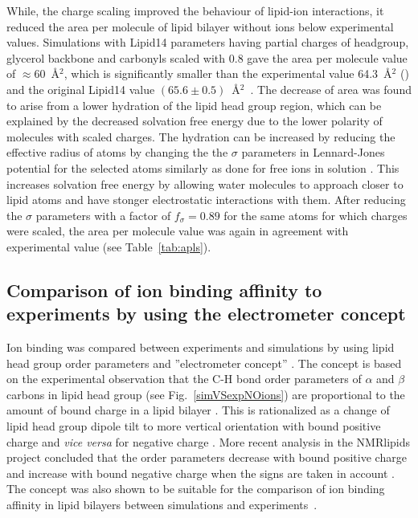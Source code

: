 \documentclass[aip,jcp,twocolumn]{revtex4}
\begin{document}
While, the charge scaling improved the behaviour of lipid-ion interactions,
it reduced the area per molecule of lipid bilayer without ions below experimental
values. Simulations with Lipid14 parameters having partial charges of headgroup, glycerol
backbone and carbonyls scaled with 0.8 gave the area per molecule value of $\approx$60~\AA$^2$,
which is significantly smaller than the experimental value 64.3~\AA$^2$ (\cite{})
and the original Lipid14 value $(65.6 \pm 0.5)$~\AA$^2$~\cite{dickson14}.
The decrease of area was found to arise from a lower hydration of the lipid head group region,
which can be explained by the decreased solvation free energy due to the lower polarity
of molecules with scaled charges. The hydration can be increased
by reducing the effective radius of atoms by changing the 
the $\sigma$ parameters in Lennard-Jones potential for the selected atoms
similarly as done for free ions in solution \cite{kohagen14,kohagen16,Pluharova2014}.
This increases solvation free energy by allowing water molecules to
approach closer to lipid atoms and have stonger electrostatic interactions with them.
After reducing the $\sigma$ parameters with a factor of $f_\sigma = 0.89$
for the same atoms for which charges were scaled, the area per molecule value was
again in agreement with experimental value (see Table~\ref{tab:apls}). 


\subsection{Comparison of ion binding affinity to experiments by using the electrometer concept} \label{section:electrometer}
Ion binding was compared between experiments and simulations by 
using lipid head group order parameters and 
''electrometer concept'' \cite{seelig87,catte16}.
The concept is based on the experimental observation that the C-H bond
order parameters of $\alpha$ and $\beta$ carbons in lipid head group
(see Fig.~\ref{simVSexpNOions}) are proportional to the amount 
of bound charge in a lipid bilayer \cite{seelig87}.
This is rationalized as a change of lipid head group dipole tilt to more vertical orientation
with bound positive charge and {\it vice versa} for negative charge \cite{seelig87}. 
More recent analysis in the NMRlipids project concluded 
that the order parameters decrease with bound positive charge 
and increase with bound negative charge when the signs are taken 
in account \cite{ollila16,catte16}. The concept was also shown
to be suitable for the comparison of ion binding affinity in lipid 
bilayers between simulations and experiments~\cite{catte16}.
 
\end{document}

